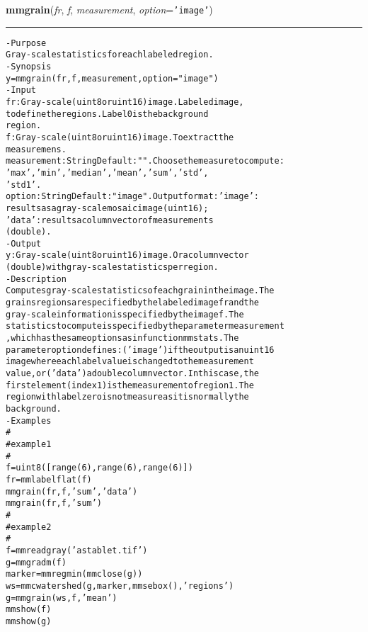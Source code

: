     \begin{boxedminipage}{\textwidth}

    \raggedright \textbf{mmgrain}(\textit{fr}, \textit{f}, \textit{measurement}, \textit{option}=\texttt{'\-i\-m\-a\-g\-e\-'\-})

    \vspace{-1.5ex}

    \rule{\textwidth}{0.5\fboxrule}
\begin{alltt}
- Purpose
    Gray-scale statistics for each labeled region.
- Synopsis
    y = mmgrain(fr, f, measurement, option="image")
- Input
    fr:          Gray-scale (uint8 or uint16) image. Labeled image,
                 to define the regions. Label 0 is the background
                 region.
    f:           Gray-scale (uint8 or uint16) image. To extract the
                 measuremens.
    measurement: String Default: "". Choose the measure to compute:
                 'max', 'min', 'median', 'mean', 'sum', 'std',
                 'std1'.
    option:      String Default: "image". Output format: 'image':
                 results as a gray-scale mosaic image (uint16);
                 'data': results a column vector of measurements
                 (double).
- Output
    y: Gray-scale (uint8 or uint16) image. Or a column vector
       (double) with gray-scale statistics per region.
- Description
    Computes gray-scale statistics of each grain in the image. The
    grains regions are specified by the labeled image fr and the
    gray-scale information is specified by the image f . The
    statistics to compute is specified by the parameter measurement
    , which has the same options as in function mmstats . The
    parameter option defines: ('image') if the output is an uint16
    image where each label value is changed to the measurement
    value, or ('data') a double column vector. In this case, the
    first element (index 1) is the measurement of region 1. The
    region with label zero is not measure as it is normally the
    background.
- Examples
    \#
    \#   example 1
    \#
    f=uint8([range(6),range(6),range(6)])
    fr=mmlabelflat(f)
    mmgrain(fr,f,'sum','data')
    mmgrain(fr,f,'sum')
    \#
    \#   example 2
    \#
    f=mmreadgray('astablet.tif')
    g=mmgradm(f)
    marker=mmregmin(mmclose(g))
    ws=mmcwatershed(g,marker,mmsebox(),'regions')
    g=mmgrain(ws,f,'mean')
    mmshow(f)
    mmshow(g)\end{alltt}

    \vspace{1ex}

    \end{boxedminipage}

